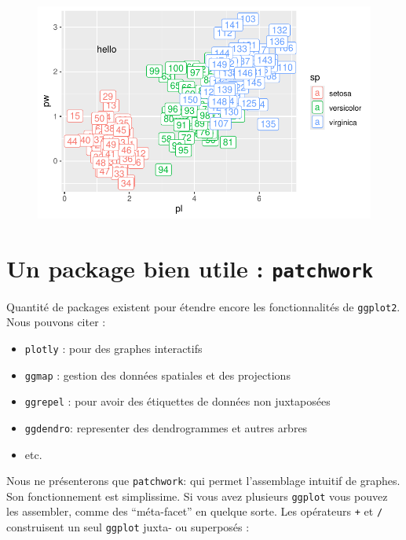 \documentclass[
  letterpaper,
  DIV=11,
  numbers=noendperiod]{scrreprt}
\providecommand{\tightlist}{%
  \setlength{\itemsep}{0pt}\setlength{\parskip}{0pt}}\usepackage{longtable,booktabs,array}
\begin{document}
\begin{figure}[H]

{\centering \includegraphics{ggplot2_files/figure-pdf/unnamed-chunk-34-1.pdf}

}

\end{figure}

\hypertarget{un-package-bien-utile-patchwork}{%
\section{\texorpdfstring{Un package bien utile :
\texttt{patchwork}}{Un package bien utile : patchwork}}\label{un-package-bien-utile-patchwork}}

Quantité de packages existent pour étendre encore les fonctionnalités de
\texttt{ggplot2}. Nous pouvons citer :

\begin{itemize}
\tightlist
\item
  \texttt{plotly} : pour des graphes interactifs
\item
  \texttt{ggmap} : gestion des données spatiales et des projections
\item
  \texttt{ggrepel} : pour avoir des étiquettes de données non
  juxtaposées
\item
  \texttt{ggdendro}: representer des dendrogrammes et autres arbres
\item
  etc.
\end{itemize}

Nous ne présenterons que \texttt{patchwork}: qui permet l'assemblage
intuitif de graphes. Son fonctionnement est simplissime. Si vous avez
plusieurs \texttt{ggplot} vous pouvez les assembler, comme des
``méta-facet'' en quelque sorte. Les opérateurs \texttt{+} et \texttt{/}
construisent un seul \texttt{ggplot} juxta- ou superposés :
\end{document}
